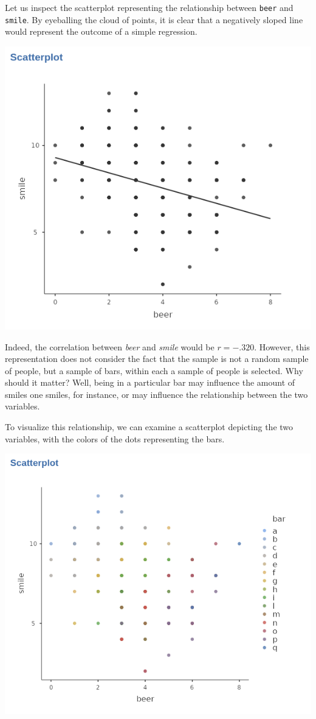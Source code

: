 \documentclass[
]{book}
\begin{document}
Let us inspect the scatterplot representing the relationship between \texttt{beer} and \texttt{smile}. By eyeballing the cloud of points, it is clear that a negatively sloped line would represent the outcome of a simple regression.

\includegraphics[width=0.8\linewidth]{bookletpics/4_theory_plot1}

Indeed, the correlation between \emph{beer} and \emph{smile} would be \(r=-.320\). However, this representation does not consider the fact that the sample is not a random sample of people, but a sample of bars, within each a sample of people is selected. Why should it matter? Well, being in a particular bar may influence the amount of smiles one smiles, for instance, or may influence the relationship between the two variables.

To visualize this relationship, we can examine a scatterplot depicting the two variables, with the colors of the dots representing the bars.

\includegraphics[width=0.8\linewidth]{bookletpics/4_theory_plot2}
\end{document}
